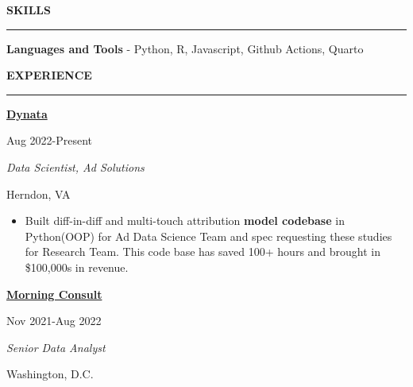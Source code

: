 \documentclass[
  16,
]{article}
\providecommand{\tightlist}{%
  \setlength{\itemsep}{0pt}\setlength{\parskip}{0pt}}\usepackage{longtable,booktabs,array}
\begin{document}
\begin{large}{\bf SKILLS}
  \vspace{3pt}
  \hrule
\end{large}
\vspace{-0.16cm}

\textbf{Languages and Tools} - Python, R, Javascript, Github Actions,
Quarto

\begin{large}{\bf EXPERIENCE}
  \vspace{3pt}
  \hrule
  \begin{multicols}{2}
    \begin{flushleft}{\bf \href{https://www.dynata.com/}{Dynata}}\end{flushleft}
    \begin{flushright}Aug 2022-Present\end{flushright}
  \end{multicols}
  \vspace{-0.17cm}
  \begin{multicols}{2}
    \begin{flushleft}\textit{Data Scientist, Ad Solutions}\end{flushleft}
    \begin{flushright}Herndon, VA\end{flushright}\end
  {multicols}
\end{large}
\vspace{-0.16cm}

\begin{itemize}
\tightlist
\item
  Built diff-in-diff and multi-touch attribution \textbf{model codebase}
  in Python(OOP) for Ad Data Science Team and spec requesting these
  studies for Research Team. This code base has saved 100+ hours and
  brought in \$100,000s in revenue.
\end{itemize}

\vspace{7pt}

\begin{large}
  \begin{multicols}{2}
    \begin{flushleft}{\bf \href{https://morningconsult.com/}{Morning Consult}}\end{flushleft}
    \begin{flushright}Nov 2021-Aug 2022\end{flushright}
  \end{multicols}
  \vspace{-0.17cm}
  \begin{multicols}{2}
    \begin{flushleft}\textit{Senior Data Analyst}\end
    {flushleft}\begin{flushright}Washington, D.C.\end
    {flushright}
  \end{multicols}
\end{large}
\vspace{-0.16cm}
\end{document}
